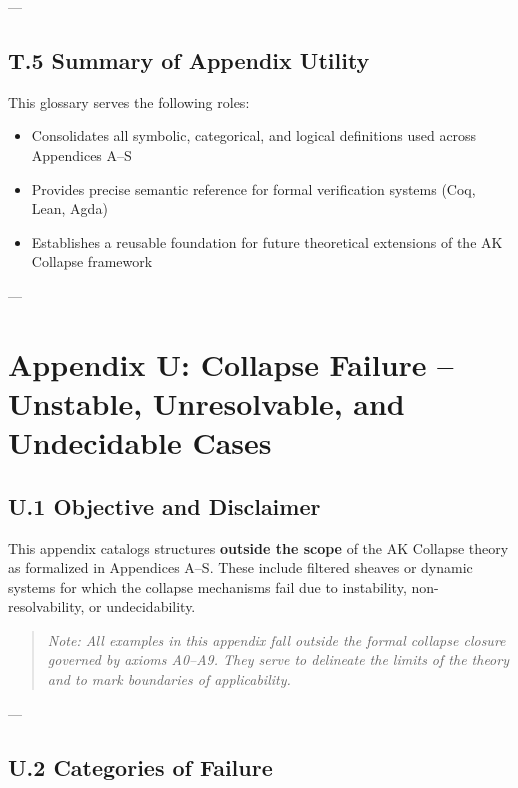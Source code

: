 \documentclass[11pt]{article}
\begin{document}
---

\subsection*{T.5 Summary of Appendix Utility}

This glossary serves the following roles:

\begin{itemize}
  \item Consolidates all symbolic, categorical, and logical definitions used across Appendices A–S
  \item Provides precise semantic reference for formal verification systems (Coq, Lean, Agda)
  \item Establishes a reusable foundation for future theoretical extensions of the AK Collapse framework
\end{itemize}

---

\section*{Appendix U: Collapse Failure – Unstable, Unresolvable, and Undecidable Cases}

\subsection*{U.1 Objective and Disclaimer}

This appendix catalogs structures \textbf{outside the scope} of the AK Collapse theory as formalized in Appendices A–S.  
These include filtered sheaves or dynamic systems for which the collapse mechanisms fail due to instability, non-resolvability, or undecidability.

\begin{quote}
\textit{Note: All examples in this appendix fall outside the formal collapse closure governed by axioms A0–A9.  
They serve to delineate the limits of the theory and to mark boundaries of applicability.}
\end{quote}

---

\subsection*{U.2 Categories of Failure}
\end{document}
